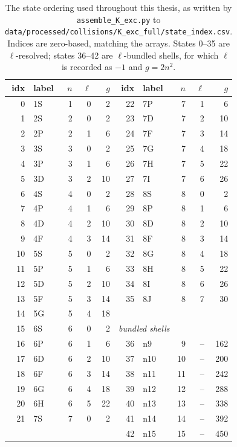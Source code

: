 \begin{table}[htbp]
  \centering
  \caption[The 43-state ordering]{The state ordering used throughout this
    thesis, as written by \texttt{assemble\_K\_exc.py} to
    \texttt{data/processed/collisions/K\_exc\_full/state\_index.csv}. Indices
    are zero-based, matching the arrays. States 0--35 are $\ell$-resolved;
    states 36--42 are $\ell$-bundled shells, for which $\ell$ is recorded as
    $-1$ and $g = 2n^2$.}
  \label{tab:state_ordering}
  \small
  \begin{tabular}{rlrrr@{\hskip 2em}rlrrr}
    \toprule
    idx & label & $n$ & $\ell$ & $g$ & idx & label & $n$ & $\ell$ & $g$ \\
    \midrule
     0 & 1S & 1 & 0 &  2 & 22 & 7P & 7 & 1 &  6 \\
     1 & 2S & 2 & 0 &  2 & 23 & 7D & 7 & 2 & 10 \\
     2 & 2P & 2 & 1 &  6 & 24 & 7F & 7 & 3 & 14 \\
     3 & 3S & 3 & 0 &  2 & 25 & 7G & 7 & 4 & 18 \\
     4 & 3P & 3 & 1 &  6 & 26 & 7H & 7 & 5 & 22 \\
     5 & 3D & 3 & 2 & 10 & 27 & 7I & 7 & 6 & 26 \\
     6 & 4S & 4 & 0 &  2 & 28 & 8S & 8 & 0 &  2 \\
     7 & 4P & 4 & 1 &  6 & 29 & 8P & 8 & 1 &  6 \\
     8 & 4D & 4 & 2 & 10 & 30 & 8D & 8 & 2 & 10 \\
     9 & 4F & 4 & 3 & 14 & 31 & 8F & 8 & 3 & 14 \\
    10 & 5S & 5 & 0 &  2 & 32 & 8G & 8 & 4 & 18 \\
    11 & 5P & 5 & 1 &  6 & 33 & 8H & 8 & 5 & 22 \\
    12 & 5D & 5 & 2 & 10 & 34 & 8I & 8 & 6 & 26 \\
    13 & 5F & 5 & 3 & 14 & 35 & 8J & 8 & 7 & 30 \\
    14 & 5G & 5 & 4 & 18 & \multicolumn{5}{c}{} \\
    15 & 6S & 6 & 0 &  2 & \multicolumn{5}{l}{\emph{bundled shells}} \\
    16 & 6P & 6 & 1 &  6 & 36 & n9  &  9 & -- & 162 \\
    17 & 6D & 6 & 2 & 10 & 37 & n10 & 10 & -- & 200 \\
    18 & 6F & 6 & 3 & 14 & 38 & n11 & 11 & -- & 242 \\
    19 & 6G & 6 & 4 & 18 & 39 & n12 & 12 & -- & 288 \\
    20 & 6H & 6 & 5 & 22 & 40 & n13 & 13 & -- & 338 \\
    21 & 7S & 7 & 0 &  2 & 41 & n14 & 14 & -- & 392 \\
       &    &   &   &    & 42 & n15 & 15 & -- & 450 \\
    \bottomrule
  \end{tabular}
\end{table}


